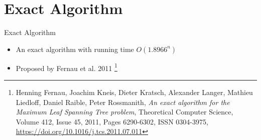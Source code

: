 \documentclass{beamer}
\begin{document}
\section{Exact Algorithm}


\begin{frame}{Exact Algorithm}
    \begin{itemize}
        \item An exact algorithm with running time $O({1.8966}^{n})$
        \item Proposed by Fernau et al. 2011 \footnote{Henning Fernau, Joachim Kneis, Dieter Kratsch, Alexander Langer, Mathieu Liedloff, Daniel Raible, Peter Rossmanith, \textit{An exact algorithm for the Maximum Leaf Spanning Tree problem}, Theoretical Computer Science, Volume 412, Issue 45, 2011, Pages 6290-6302, ISSN 0304-3975, \href{https://doi.org/10.1016/j.tcs.2011.07.011}{\url{https://doi.org/10.1016/j.tcs.2011.07.011}}}
    \end{itemize}
\end{frame}

\end{document}
